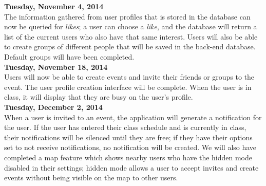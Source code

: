 \documentclass[11pt]{article}
\begin{document}
\textbf{Tuesday, November 4, 2014}
\\	\indent The information gathered from user profiles
    that is stored in the database can now be queried for \textit{likes}; a user can choose a 
    \textit{like}, and the database will return a list of the current users who
    also have that same interest. Users will also be able to
    create groups of different people that will be saved 
     in the back-end database. Default groups will have been completed.  \\

\textbf{Tuesday, November 18, 2014}
\\	\indent Users will now be able to create events and invite their friends or groups to the event. 
    The user profile creation interface will be complete. When the user is in
    class, it will display that they are busy on the user's profile.\\

\textbf{Tuesday, December 2, 2014}
\\	\indent When a user is invited to an event, the application will generate a
    notification for the user. If the user has entered their class schedule and is currently in 
    class, their notifications will be silenced until they are free; if they have
    their options set to not receive notifications, no notification will be created.
    We will also have completed a map feature which shows nearby users who have the
    hidden mode disabled in their settings; hidden mode allows a user to accept
    invites and create events without being visible on the map to other users.\\

\newpage

\nocite{}
\end{document}
